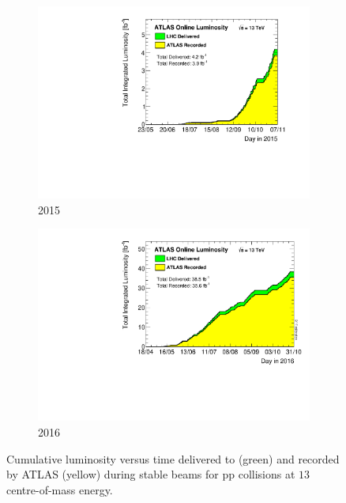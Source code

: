 \begin{figure}[h!]
\centering
\captionsetup{justification=centering}
	\hspace{-2cm}
    \begin{subfigure}[b]{0.35\textwidth}
        \includegraphics[width=\textwidth,angle=-90]{figures/detector/Lumi_2015}
        \caption{2015}
        \label{fig:Lumi_2015}
    \end{subfigure}
    \quad
    \quad
    \quad
    \quad
    \begin{subfigure}[b]{0.35\textwidth}
        \includegraphics[width=\textwidth,angle=-90]{figures/detector/Lumi_2016}
        \caption{2016}
        \label{fig:Lumi_2016}
    \end{subfigure}
\caption{Cumulative luminosity versus time delivered to (green) and recorded by ATLAS (yellow) during stable beams for pp collisions at $13$ \TeV centre-of-mass energy.}
\label{fig:Lumi}
\end{figure}





